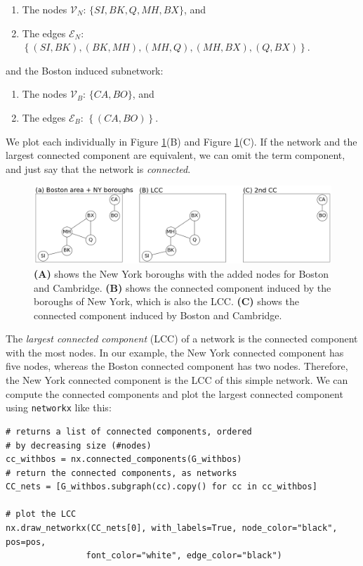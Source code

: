 \begin{enumerate}
    \item The nodes $\mathcal V_N$: $\{SI, BK, Q, MH, BX\}$, and
    \item The edges $\mathcal E_N$: $\left\{(SI, BK), (BK, MH), (MH, Q), (MH, BX), (Q, BX)\right\}$.
\end{enumerate}

and the Boston induced subnetwork:
\begin{enumerate}
    \item The nodes $\mathcal V_B$: $\{CA, BO\}$, and
    \item The edges $\mathcal E_B$: $\left\{(CA, BO)\right\}$.
\end{enumerate}

We plot each individually in Figure \ref{fig:ch4:lcc}(B) and Figure \ref{fig:ch4:lcc}(C). If the network and the largest connected component are equivalent, we can omit the term {component}, and just say that the network is \textit{connected}.

\begin{figure}[h]
    \centering
    \includegraphics[width=\linewidth]{representations/ch4/Images/lcc.png}
    \caption[Connected Components]{\textbf{(A)} shows the New York boroughs with the added nodes for Boston and Cambridge. \textbf{(B)} shows the connected component induced by the boroughs of New York, which is also the LCC. \textbf{(C)} shows the connected component induced by Boston and Cambridge.}
    \label{fig:ch4:lcc}
\end{figure}
The \textit{largest connected component} (LCC) of a network is the connected component with the most nodes. In our example, the New York connected component has five nodes, whereas the Boston connected component has two nodes. Therefore, the New York connected component is the LCC of this simple network. We can compute the connected components and plot the largest connected component using \texttt{networkx} like this:

\begin{lstlisting}[style=python]
# returns a list of connected components, ordered 
# by decreasing size (#nodes)
cc_withbos = nx.connected_components(G_withbos)
# return the connected components, as networks
CC_nets = [G_withbos.subgraph(cc).copy() for cc in cc_withbos]

# plot the LCC
nx.draw_networkx(CC_nets[0], with_labels=True, node_color="black", pos=pos,
                font_color="white", edge_color="black")
\end{lstlisting}

